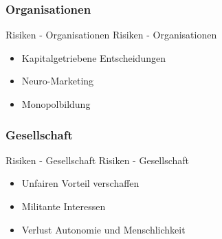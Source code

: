 \documentclass[aspectratio=169,16pt,xcolor=table]{beamer}
\begin{document}
\subsubsection{Organisationen}
\begin{frame}{Risiken - Organisationen}
Risiken - Organisationen
	\begin{itemize}
		\item{Kapitalgetriebene Entscheidungen~\cite{khan_aziz_2019}}
		\item{Neuro-Marketing~\cite{khan_aziz_2019}}
		\item{Monopolbildung~\cite{khan_aziz_2019}}
	\end{itemize}
\end{frame}

\subsubsection{Gesellschaft}
\begin{frame}{Risiken - Gesellschaft}
Risiken - Gesellschaft
	\begin{itemize}
		\item{Unfairen Vorteil verschaffen~\cite{khan_aziz_2019}}
		\item{Militante Interessen~\cite{khan_aziz_2019}}
		\item{Verlust Autonomie und Menschlichkeit~\cite{Burwell:2017aa}}
	\end{itemize}
\end{frame}

\newpage
\printbibliography %
\end{document}
